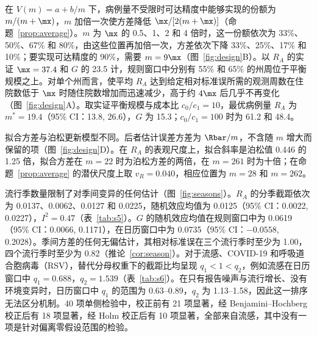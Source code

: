 在 $V(m)=a+b/m$ 下，病例量不受限时可达精度中能够实现的份额为 $m/(m+\mx)$，$m$ 加倍一次使方差降低 $\mx/[2(m+\mx)]$（命题~\ref{prop:average}）。$m$ 为 $\mx$ 的 0.5、1、2 和 4 倍时，这一份额依次为 33\%、50\%、67\% 和 80\%，由这些位置再加倍一次，方差依次下降 33\%、25\%、17\% 和 10\%；要实现可达精度的 90\%，需要 $m=9\mx$（图~\ref{fig:design}B）。以 $R_A$ 的实证 $\mx=37.4$ 和 $G$ 的 23.5 计，规则窗口中分别有 55\% 和 65\% 的州周位于平衡规模之上。对单个州而言，使平均 $R_A$ 达到给定相对标准误所需的观测周数在住院数低于 $\mx$ 时随住院数增加而迅速减少，高于约 $4\mx$ 后几乎不再变化（图~\ref{fig:design}A）。取实证平衡规模与成本比 $c_0/c_1=10$，最优病例量 $R_A$ 为 $m^*=19.4$（95\% CI：13.8, 26.6），$G$ 为 15.3；$c_0/c_1=100$ 时为 61.2 和 48.4。

拟合方差与泊松更新模型不同。后者估计误差方差为 $\Rbar/m$，不含随 $m$ 增大而保留的项（图~\ref{fig:design}D）。在 $R_A$ 的表观尺度上，拟合斜率是泊松值 0.446 的 1.25 倍，拟合方差在 $m=22$ 时为泊松方差的两倍，在 $m=261$ 时为十倍；在命题~\ref{prop:average} 的潜伏尺度上取 $v_R=0.040$，相应位置为 $m=28$ 和 $m=262$。

流行季数量限制了对季间变异的任何估计（图~\ref{fig:seasons}）。$R_A$ 的分季截距依次为 0.0137、0.0062、0.0127 和 0.0225，随机效应均值为 0.0125（95\% CI：0.0022, 0.0227），$I^2=0.47$（表~\ref{tab:s5}）。$G$ 的随机效应均值在规则窗口中为 0.0619（95\% CI：0.0066, 0.1171），在日历窗口中为 0.0735（95\% CI：$-0.0558$, 0.2028）。季间方差的任何无偏估计，其相对标准误在三个流行季时至少为 1.00，四个流行季时至少为 0.82（推论~\ref{cor:season}）。对于流感、COVID-19 和呼吸道合胞病毒（RSV），替代分母权重下的截距比均呈现 $q_1<1<q_2$，例如流感在日历窗口中 $q_1=0.688$，$q_2=1.539$（表~\ref{tab:s6}）。在只有报告噪声与流行增长、没有环境变异时，日历窗口中 $q_1$ 的范围为 0.63--0.89，$q_2$ 为 1.13--1.58，因此这一排序无法区分机制。40 项单侧检验中，校正前有 21 项显著，经 Benjamini--Hochberg 校正后有 18 项显著，经 Holm 校正后有 10 项显著，全部来自流感，其中没有一项是针对偏离零假设范围的检验。
